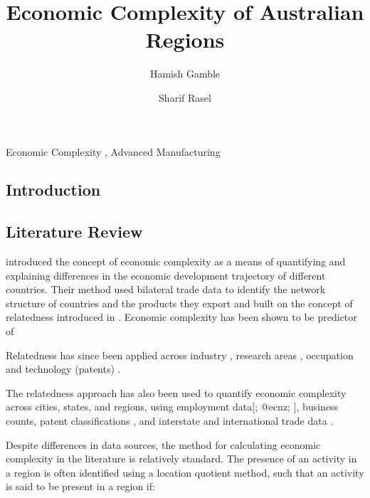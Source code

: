 \documentclass[
  number]{elsarticle}
\begin{document}
\begin{frontmatter}
\title{Economic Complexity of Australian Regions}
\author[1]{Hamish Gamble%
%
}
\author[1]{Sharif Rasel%
%
}





        





\begin{keyword}
    Economic Complexity \sep 
    Advanced Manufacturing
\end{keyword}
\end{frontmatter}
    

\subsection{Introduction}\label{introduction}

\subsection{Literature Review}\label{literature-review}

\citep{hidalgo2009} introduced the concept of economic complexity as a
means of quantifying and explaining differences in the economic
development trajectory of different countries. Their method used
bilateral trade data to identify the network structure of countries and
the products they export and built on the concept of relatedness
introduced in \citep{hidalgo2007}. Economic complexity has been shown to
be predictor of

Relatedness has since been applied across industry \citep{neffke2012},
research areas \citep{guevara2016}, occupation \citep{muneepeerakul2013}
and technology (patents) \citep{kogler2013}.

The relatedness approach has also been used to quantify economic
complexity across cities, states, and regions, using employment
data{[}\citep{ecus}; @ecnz; \citep{ecmexico}{]}, business
counts\citep{ecchina}, patent classifications \citep{balland2021}, and
interstate and international trade data \citep{ecaus}.

Despite differences in data sources, the method for calculating economic
complexity in the literature is relatively standard. The presence of an
activity in a region is often identified using a location quotient
method, such that an activity is said to be present in a region if:
\end{document}
